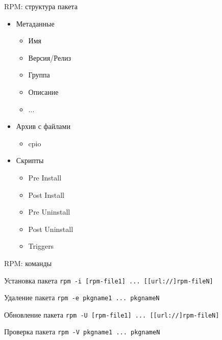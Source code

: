\begin{frame}{RPM: структура пакета}
	\begin{itemize}
		\item Метаданные
			\begin{itemize}
				\item Имя
				\item Версия/Релиз
				\item Группа
				\item Описание
				\item ...
			\end{itemize}
		\item Архив с файлами
			\begin{itemize}
				\item cpio
			\end{itemize}
		\item Скрипты
			\begin{itemize}
				\item Pre Install
				\item Post Install
				\item Pre Uninstall
				\item Post Uninstall \bigskip
				\item Triggers
			\end{itemize}
	\end{itemize}
\end{frame}

\begin{frame}{RPM: команды}
	\begin{block}{Установка пакета}
		{\tt rpm -i [rpm-file1] ... [[url://]rpm-fileN] }
	\end{block}
	\begin{block}{Удаление пакета}
		{\tt rpm -e pkgname1 ... pkgnameN }
	\end{block}
	\begin{block}{Обновление пакета}
		{\tt rpm -U [rpm-file1] ... [[url://]rpm-fileN] }
	\end{block}
	\begin{block}{Проверка пакета}
		{\tt rpm -V pkgname1 ... pkgnameN }
	\end{block}
\end{frame}

